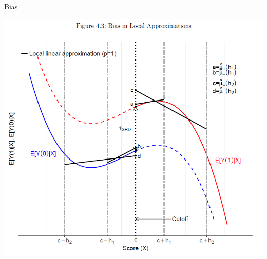 \begin{frame}{Bias}
  \begin{center}
  \includegraphics[height=0.8\textheight]{./resources/CatteneoBias}
  \end{center}
\end{frame}

